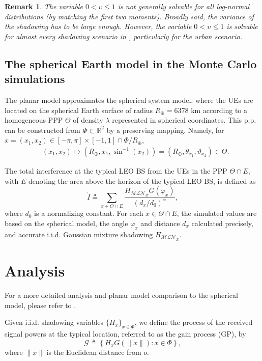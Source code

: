 \documentclass[lettersize,journal]{IEEEtran}
\newcommand{\rEarth}{R_{\oplus}}
\newcommand{\R}{\mathbb{R}}
\newtheorem*{remark}{Remark}
\begin{document}
\begin{remark}
  The variable $0 < \upsilon \leq 1$ is not generally solvable for all log-normal distributions (by matching the first two moments). Broadly said, the variance of the shadowing has to be large enough. However, the variable $0<\upsilon \leq 1$ is solvable for almost every shadowing scenario in \cite{TR38.811}, particularly for the urban scenario.
\end{remark}

\subsection{The spherical Earth model in the Monte Carlo simulations }

\label{sec:sphericalmodel}
The planar model approximates the spherical system model, where the UEs are located on the spherical Earth surface of radius $\rEarth= 6378$ km according to a homogeneous PPP $\Theta$ of density $\lambda$ represented in spherical coordinates. This p.p. can be constructed from $\Phi \subset \R^2$ by a preserving mapping. Namely, for $x=(x_1,x_2) \in [-\pi,\pi]\times[-1,1]\cap\Phi/\rEarth$,
\begin{align}
  &(x_1,x_2)\mapsto (\rEarth,x_1,\sin^{-1}(x_2))=(\rEarth,\theta_{x_1},\vartheta_{x_2}) \in \Theta.
\end{align}

The total interference at the typical LEO BS from the UEs in the PPP $\Theta \cap E $, with $E$ denoting the area above the horizon of the typical LEO BS, is defined as
\begin{equation}
  \label{eq:mathringptot}
  \mathring{I} \triangleq  \sum_{x \in \Theta \cap E }  \frac{{H_{\mathcal{M}\mathcal{L}\mathcal{N}}}_x G(\varphi_x)}{(d_x/d_0)^{\alpha}},
\end{equation}
where $d_0$ is a normalizing constant. For each $x \in \Theta \cap E$, the simulated values are based on the spherical model, the angle $\varphi_x$ and distance $d_x$ calculated precisely, and accurate i.i.d. Gaussian mixture shadowing ${H_{\mathcal{M}\mathcal{L}\mathcal{N}}}_x$.

\section{Analysis}
For a more detailed analysis and planar model comparison to the spherical model, please refer to \cite{10909705}.
         
Given i.i.d. shadowing variables $\{H_x\}_{x \in \Phi}$, we define the process of the received signal powers at the typical location, referred to as the gain process (GP), by
\begin{equation}
  \label{eq:gainprocess}
  \mathcal{G} \triangleq \left\{ H_x G(\|x\|) : x \in \Phi \right\},
\end{equation}
where $\|x\|$ is the Euclidean distance from $\textit{o}$. 
\end{document}
